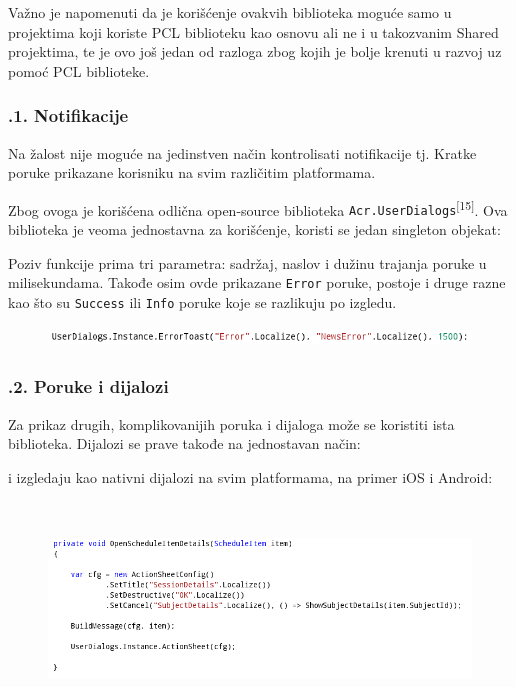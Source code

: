 \documentclass[a4paper]{article}
\begin{document}
Važno je napomenuti da je korišćenje ovakvih biblioteka moguće samo u
projektima koji koriste PCL biblioteku kao osnovu ali ne i u takozvanim
Shared projektima, te je ovo još jedan od razloga zbog kojih je bolje
krenuti u razvoj uz pomoć PCL biblioteke.

\subsubsection[7.10.1. Notifikacije]{.1. Notifikacije}
\hypertarget{RefHeadingToc877882405265}{}Na žalost nije moguće na
jedinstven način kontrolisati notifikacije tj. Kratke poruke prikazane
korisniku na svim različitim platformama.

Zbog ovoga je korišćena odlična open-source biblioteka
\texttt{\textcolor[rgb]{0.0,0.4,0.8}{Acr.UserDialogs}}\textsuperscript{[15]}.
Ova biblioteka je veoma jednostavna za korišćenje, koristi se jedan
singleton objekat:

Poziv funkcije prima tri parametra: sadržaj, naslov i dužinu trajanja
poruke u milisekundama. Takođe osim ovde prikazane
\texttt{\textcolor[rgb]{0.0,0.4,0.8}{Error}} poruke, postoje i druge
razne kao što su \texttt{\textcolor[rgb]{0.0,0.4,0.8}{Success}} ili
\texttt{\textcolor[rgb]{0.0,0.4,0.8}{Info}} poruke koje se razlikuju po
izgledu.

\begin{figure}
\centering
\includegraphics[width=170mm,height=5.59mm]{msc-img68.png}
\end{figure}
\subsubsection[]{\rmfamily }
\clearpage\subsubsection[7.10.2. Poruke i dijalozi]{.2.
Poruke i dijalozi}
\hypertarget{RefHeadingToc879882405265}{}Za prikaz drugih,
komplikovanijih poruka i dijaloga može se koristiti ista biblioteka.
Dijalozi se prave takođe na jednostavan način:

i izgledaju kao nativni dijalozi na svim platformama, na primer iOS i
Android:

\begin{figure}
\centering
\includegraphics[width=170mm,height=56.59mm]{msc-img69.png}
\end{figure}
\end{document}
